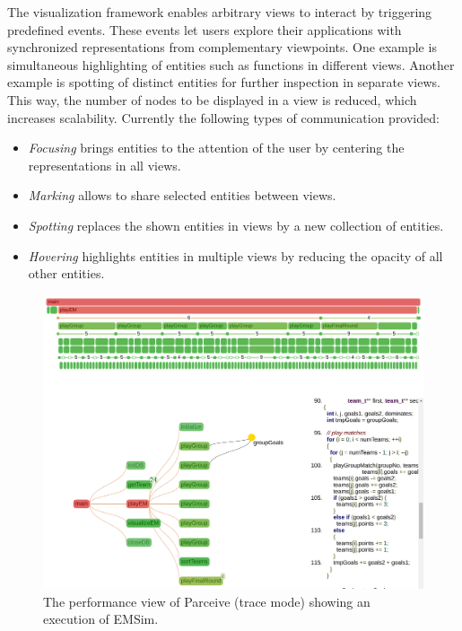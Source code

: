 The visualization framework enables arbitrary views to interact by triggering
predefined events. These events let users explore their applications with
synchronized representations from complementary viewpoints. One example is
simultaneous highlighting of entities such as functions in different views.
Another example is spotting of distinct entities for further inspection in
separate views. This way, the number of nodes to be displayed in a view is
reduced, which increases scalability. Currently the following types of
communication provided:
\begin{itemize}
	\item \textit{Focusing} brings entities to the attention of the
user by centering the representations in all views.
	\item \textit{Marking} allows to share selected entities between views.
	\item \textit{Spotting} replaces the shown entities in views by a new
collection of entities.
	\item \textit{Hovering} highlights entities in multiple views by reducing
the opacity of all other entities.
\end{itemize}

\begin{figure}[ht!]
	\begin{center}
		\includegraphics[clip, trim=0.1cm 16.0cm 0.1cm 0.1cm,
width=\linewidth]{img/performance_view.pdf}
		\caption{The performance view of Parceive (trace mode) showing an execution
of EMSim.}
		\label{fig:emsim}
	\end{center}
\end{figure}